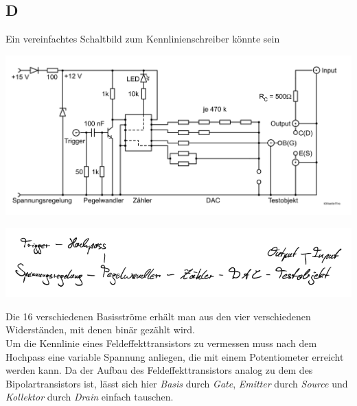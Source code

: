 \documentclass[10pt]{article}
\newenvironment{Figure}
  {\par\medskip\noindent\minipage{\linewidth}}
  {\endminipage\par\medskip}
\begin{document}
\begin{multicols}{2}
	\subsection{D}
	Ein vereinfachtes Schaltbild zum Kennlinienschreiber könnte sein
	\begin{Figure}
                \centering
                \includegraphics[width=\textwidth]{kennlinienschreiber.png}
	\end{Figure}
	\begin{Figure}
                \centering
                \includegraphics[width=\textwidth]{D_crop.pdf}
	\end{Figure}
	Die 16 verschiedenen Basisströme erhält man aus den vier verschiedenen Widerständen, mit denen binär gezählt wird.
	\\\indent Um die Kennlinie eines Feldeffekttransistors zu vermessen muss nach dem Hochpass eine variable Spannung anliegen, die mit einem Potentiometer erreicht werden kann.
	Da der Aufbau des Feldeffekttransistors analog zu dem des Bipolartransistors ist, lässt sich hier \textit{Basis} durch \textit{Gate}, \textit{Emitter} durch \textit{Source} und \textit{Kollektor} durch \textit{Drain} einfach tauschen.


\end{multicols}
\end{document}

